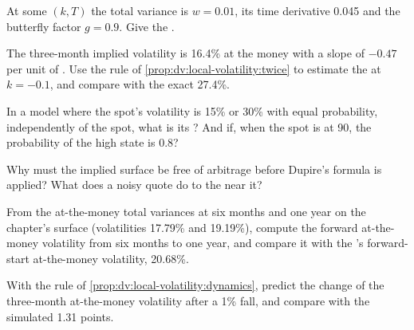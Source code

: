 \begin{exercise}[$\star$]\label{exo:dv:local-volatility:1}
At some $(k,T)$ the total variance is $w=0.01$, its time derivative 0.045 and the butterfly factor $g=0.9$.
Give the .
\end{exercise}

\begin{exercise}[$\star$]\label{exo:dv:local-volatility:2}
The three-month implied volatility is 16.4\% at the money with a slope of $-0.47$ per unit of . Use
the rule of \cref{prop:dv:local-volatility:twice} to estimate the  at $k=-0.1$, and compare with
the exact 27.4\%.
\end{exercise}

\begin{exercise}[$\star$]\label{exo:dv:local-volatility:3}
In a model where the spot's volatility is 15\% or 30\% with equal probability, independently of the spot, what is
its ? And if, when the spot is at 90, the probability of the high state is 0.8?
\end{exercise}

\begin{exercise}[$\star\star$]\label{exo:dv:local-volatility:4}
Why must the implied surface be free of arbitrage before Dupire's formula is applied? What does a noisy quote do
to the  near it?
\end{exercise}

\begin{exercise}[$\star\star$]\label{exo:dv:local-volatility:5}
From the at-the-money total variances at six months and one year on the chapter's surface (volatilities 17.79\% and
19.19\%), compute the forward at-the-money volatility from six months to one year, and compare it with the 's forward-start at-the-money volatility, 20.68\%.
\end{exercise}

\begin{exercise}[$\star\star$]\label{exo:dv:local-volatility:6}
With the rule of \cref{prop:dv:local-volatility:dynamics}, predict the change of the three-month at-the-money
volatility after a 1\% fall, and compare with the simulated 1.31 points.
\end{exercise}


